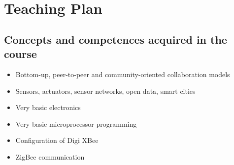 \documentclass[a4paper,oneside]{book}   %
\begin{document}
% 
% 
% 




\section{Teaching Plan}

\subsection{Concepts and competences acquired in the course}
\begin{itemize}
\item Bottom-up, peer-to-peer and community-oriented collaboration models
\item Sensors, actuators, sensor networks, open data, smart cities
\item Very basic electronics
\item Very basic microprocessor programming
\item Configuration of Digi XBee
\item ZigBee communication
\end{itemize}
\end{document}

